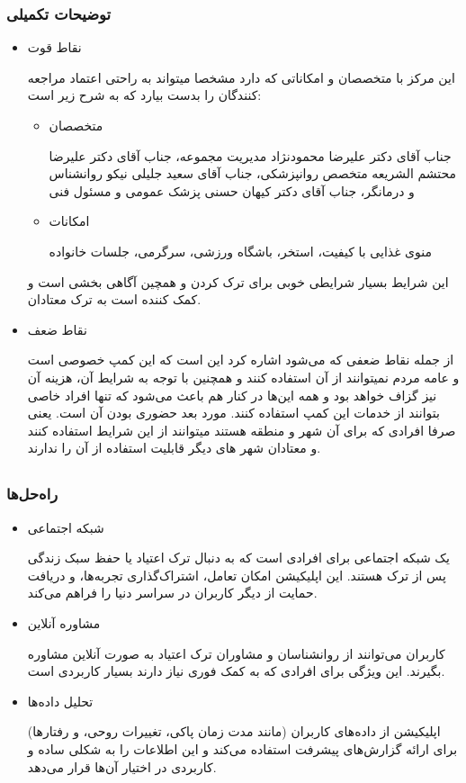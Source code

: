\documentclass[dvipsnames, svgnames, x11names, 11pt]{article}
\begin{document}
\subsubsection{توضیحات تکمیلی}
\begin{itemize}
\item 
نقاط قوت

این مرکز با متخصصان و امکاناتی که دارد مشخصا میتواند به راحتی اعتماد مراجعه کنندگان را بدست بیارد که به شرح زیر است:

\begin{itemize}
\item 
متخصصان

جناب آقای دکتر علیرضا محمودنژاد مدیریت مجموعه، جناب آقای دکتر علیرضا محتشم الشریعه متخصص روانپزشکی، جناب آقای سعید جلیلی نیکو روانشناس و درمانگر، جناب آقای دکتر کیهان حسنی پزشک عمومی و مسئول فنی

\item
امکانات

منوی غذایی با کیفیت، استخر، باشگاه ورزشی، سرگرمی، جلسات خانواده
\end{itemize}
این شرایط بسیار شرایطی خوبی برای ترک کردن و همچین آگاهی بخشی است و کمک کننده است به ترک معتادان.

\item 
نقاط ضعف

از جمله نقاط ضعفی که می‌شود اشاره کرد این است که این کمپ خصوصی است و عامه مردم نمیتوانند از آن استفاده کنند و همچنین با توجه به شرایط آن، هزینه آن نیز گزاف خواهد بود و همه این‌ها در کنار هم باعث می‌شود که تنها افراد خاصی بتوانند از خدمات این کمپ استفاده کنند. مورد بعد حضوری بودن آن است. یعنی صرفا افرادی که برای آن شهر و منطقه هستند میتوانند از این شرایط استفاده کنند و معتادان شهر های دیگر قابلیت استفاده از آن را ندارند.
\end{itemize}


\subsection{}
\subsubsection{راه‌حل‌ها}
\begin{itemize}
\item 
شبکه اجتماعی

یک شبکه اجتماعی برای افرادی است که به دنبال ترک اعتیاد یا حفظ سبک زندگی پس از ترک هستند. این اپلیکیشن امکان تعامل، اشتراک‌گذاری تجربه‌ها، و دریافت حمایت از دیگر کاربران در سراسر دنیا را فراهم می‌کند.

\item 
مشاوره آنلاین

کاربران می‌توانند از روانشناسان و مشاوران ترک اعتیاد به صورت آنلاین مشاوره بگیرند. این ویژگی برای افرادی که به کمک فوری نیاز دارند بسیار کاربردی است.

\item 
تحلیل داده‌ها

اپلیکیشن از داده‌های کاربران (مانند مدت زمان پاکی، تغییرات روحی، و رفتارها) برای ارائه گزارش‌های پیشرفت استفاده می‌کند و این اطلاعات را به شکلی ساده و کاربردی در اختیار آن‌ها قرار می‌دهد.
\end{itemize}
\end{document}
